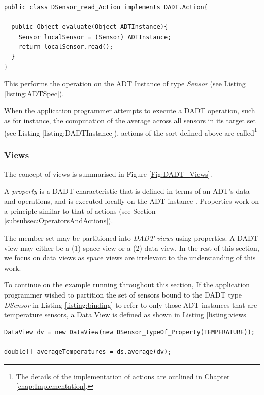 \begin{lstlisting}[frame=trbl, basewidth={0.55em, 0.6em}, captionpos=b, 
basicstyle=\ttfamily\footnotesize, breaklines, caption = Defining a DADT action, label = listing:DADTAction ]  
public class DSensor_read_Action implements DADT.Action{

  public Object evaluate(Object ADTInstance){
	Sensor localSensor = (Sensor) ADTInstance;
    return localSensor.read();
  }
}
\end{lstlisting}

This performs the operation on the ADT Instance of type \emph{Sensor} (see
Listing \ref{listing:ADTSpec}).

When the application programmer attempts to execute a DADT operation, such as
for instance, the computation of the average
across all sensors in its target set (see Listing \ref{listing:DADTInstance}),
actions of the sort defined above are called\footnote{The details of the
implementation of actions are outlined in Chapter \ref{chap:Implementation}.} 

\subsubsection{Views} \label{subsubsec:views}

The concept of views is summarised in Figure \ref{Fig:DADT_Views}.

A \emph{property} is a DADT characteristic that is defined in terms of an ADT's
data and operations, and is executed locally on the ADT instance
\cite{migliavacca_DADT:2006}. Properties work on a principle similar to that of
actions (see Section \ref{subsubsec:OperatorsAndActions}).

The member set may be partitioned into \emph{DADT views} using properties. A
DADT view may either be a (1) space view or a (2) data view. In the rest of this
section, we focus on data views as space views are irrelevant to the
understanding of this work. 

To continue on the example running throughout this section, If the application
programmer wished to partition the set of sensors bound to the DADT type
\emph{DSensor} in Listing \ref{listing:binding} to refer to only those ADT
instances that are temperature sensors, a Data View is defined as shown in Listing
\ref{listing:views} 
  
\begin{lstlisting}[frame=trbl, basewidth={0.55em, 0.6em}, captionpos=b, 
basicstyle=\ttfamily\footnotesize, breaklines, caption = Definition and use of DADT Data View, label = listing:views ]  
DataView dv = new DataView(new DSensor_typeOf_Property(TEMPERATURE));

double[] averageTemperatures = ds.average(dv);
\end{lstlisting}

